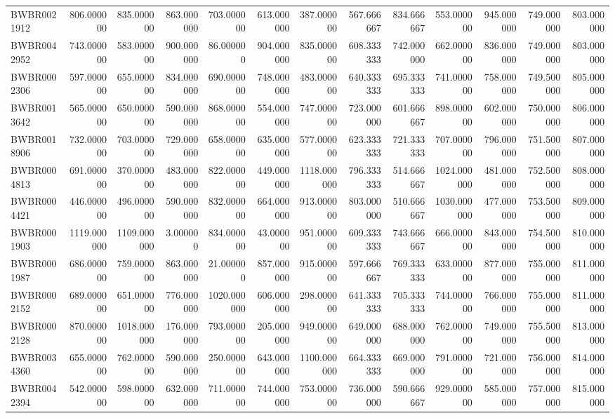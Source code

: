 \begin{longtable}{lrrrrrrrrrrrr}
BWBR0021912 & 806.000000 & 835.000000 & 863.000000 & 703.000000 & 613.000000 & 387.000000 & 567.666667 & 834.666667 & 553.000000 & 945.000000 & 749.000000 & 803.000000 \\
BWBR0042952 & 743.000000 & 583.000000 & 900.000000 & 86.000000 & 904.000000 & 835.000000 & 608.333333 & 742.000000 & 662.000000 & 836.000000 & 749.000000 & 803.000000 \\
BWBR0002306 & 597.000000 & 655.000000 & 834.000000 & 690.000000 & 748.000000 & 483.000000 & 640.333333 & 695.333333 & 741.000000 & 758.000000 & 749.500000 & 805.000000 \\
BWBR0013642 & 565.000000 & 650.000000 & 590.000000 & 868.000000 & 554.000000 & 747.000000 & 723.000000 & 601.666667 & 898.000000 & 602.000000 & 750.000000 & 806.000000 \\
BWBR0018906 & 732.000000 & 703.000000 & 729.000000 & 658.000000 & 635.000000 & 577.000000 & 623.333333 & 721.333333 & 707.000000 & 796.000000 & 751.500000 & 807.000000 \\
BWBR0004813 & 691.000000 & 370.000000 & 483.000000 & 822.000000 & 449.000000 & 1118.000000 & 796.333333 & 514.666667 & 1024.000000 & 481.000000 & 752.500000 & 808.000000 \\
BWBR0004421 & 446.000000 & 496.000000 & 590.000000 & 832.000000 & 664.000000 & 913.000000 & 803.000000 & 510.666667 & 1030.000000 & 477.000000 & 753.500000 & 809.000000 \\
BWBR0001903 & 1119.000000 & 1109.000000 & 3.000000 & 834.000000 & 43.000000 & 951.000000 & 609.333333 & 743.666667 & 666.000000 & 843.000000 & 754.500000 & 810.000000 \\
BWBR0001987 & 686.000000 & 759.000000 & 863.000000 & 21.000000 & 857.000000 & 915.000000 & 597.666667 & 769.333333 & 633.000000 & 877.000000 & 755.000000 & 811.000000 \\
BWBR0002152 & 689.000000 & 651.000000 & 776.000000 & 1020.000000 & 606.000000 & 298.000000 & 641.333333 & 705.333333 & 744.000000 & 766.000000 & 755.000000 & 811.000000 \\
BWBR0002128 & 870.000000 & 1018.000000 & 176.000000 & 793.000000 & 205.000000 & 949.000000 & 649.000000 & 688.000000 & 762.000000 & 749.000000 & 755.500000 & 813.000000 \\
BWBR0034360 & 655.000000 & 762.000000 & 590.000000 & 250.000000 & 643.000000 & 1100.000000 & 664.333333 & 669.000000 & 791.000000 & 721.000000 & 756.000000 & 814.000000 \\
BWBR0042394 & 542.000000 & 598.000000 & 632.000000 & 711.000000 & 744.000000 & 753.000000 & 736.000000 & 590.666667 & 929.000000 & 585.000000 & 757.000000 & 815.000000 \\

\end{longtable}
